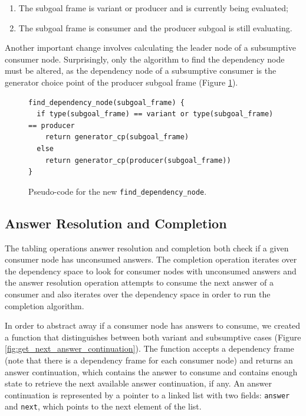 \begin{enumerate}
  \item The subgoal frame is variant or producer and is currently being evaluated;
  \item The subgoal frame is consumer and the producer subgoal is still evaluating.
\end{enumerate}

Another important change involves calculating the leader node of a subsumptive consumer node.
Surprisingly, only the algorithm to find the dependency node must be altered, as
the dependency node of a subsumptive consumer is the generator choice point of
the producer subgoal frame (Figure \ref{fig:find_dependency_node}).  

\begin{figure}[ht]
\begin{Verbatim}
find_dependency_node(subgoal_frame) {
  if type(subgoal_frame) == variant or type(subgoal_frame) == producer
    return generator_cp(subgoal_frame)
  else
    return generator_cp(producer(subgoal_frame))
}
\end{Verbatim}
\caption{Pseudo-code for the new \texttt{find\_dependency\_node}.}
\label{fig:find_dependency_node}
\end{figure}

\subsection{Answer Resolution and Completion}

The tabling operations answer resolution and completion both check if a
given consumer node has unconsumed answers. The completion operation
iterates over the dependency space to look for consumer nodes with unconsumed
answers and the answer resolution operation attempts to consume the next answer
of a consumer and also iterates over the dependency space in order to run the completion algorithm.

In order to abstract away if a consumer node has answers to consume,
we created a function that distinguishes between both variant and subsumptive cases
(Figure \ref{fig:get_next_answer_continuation}).
The function accepts a dependency frame (note that there is a dependency frame for
each consumer node) and returns an answer continuation, which contains the answer
to consume and contains enough state to retrieve the next available answer continuation, if any.
An answer continuation is represented by a pointer to a linked list with two fields:
\texttt{answer} and \texttt{next}, which points to the next element of the list.


